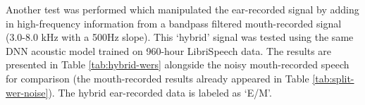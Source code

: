 

Another test was performed which manipulated the ear-recorded signal by adding in high-frequency information from a bandpass filtered mouth-recorded signal (3.0-8.0 kHz with a 500Hz slope).  This `hybrid' signal was tested using the same DNN acoustic model trained on 960-hour LibriSpeech data.  The results are presented in Table \ref{tab:hybrid-wers} alongside the noisy mouth-recorded speech for comparison (the mouth-recorded results already appeared in Table \ref{tab:split-wer-noise}).  The hybrid ear-recorded data is labeled as `E/M'.



